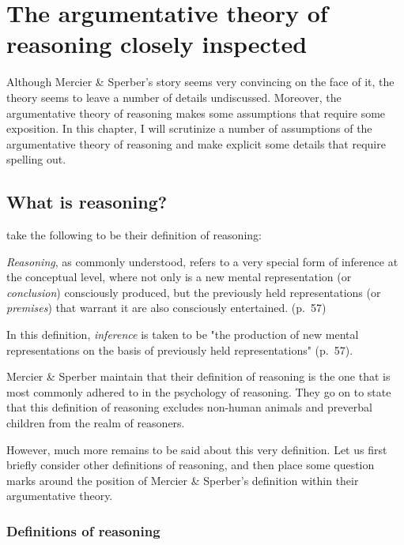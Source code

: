 \chapter{The argumentative theory of reasoning closely inspected}
\label{ch:scrutiny}

Although Mercier \& Sperber's story seems very convincing on the face of it, the theory seems to leave a number of details undiscussed. Moreover, the argumentative theory of reasoning makes some assumptions that require some exposition.
In this chapter, I will scrutinize a number of assumptions of the argumentative theory of reasoning and make explicit some details that require spelling out.

\section{What is reasoning?}

\citet{MS11} take the following to be their definition of reasoning:

\begin{quoting}
    \emph{Reasoning}, as commonly understood, refers to a very special form of inference at the conceptual level, where not only is a new mental representation (or \emph{conclusion}) consciously produced, but the previously held representations (or \emph{premises}) that warrant it are also consciously entertained.
    \hfill (p.~57)
\end{quoting}

In this definition, \emph{inference} is taken to be "the production of new mental representations on the basis of previously held representations" (p.~57).

Mercier \& Sperber maintain that their definition of reasoning is the one that is most commonly adhered to in the psychology of reasoning.
They go on to state that this definition of reasoning excludes non-human animals and preverbal children from the realm of reasoners.

However, much more remains to be said about this very definition. Let us first briefly consider other definitions of reasoning, and then place some question marks around the position of Mercier \& Sperber's definition within their argumentative theory.

\subsection{Definitions of reasoning}


